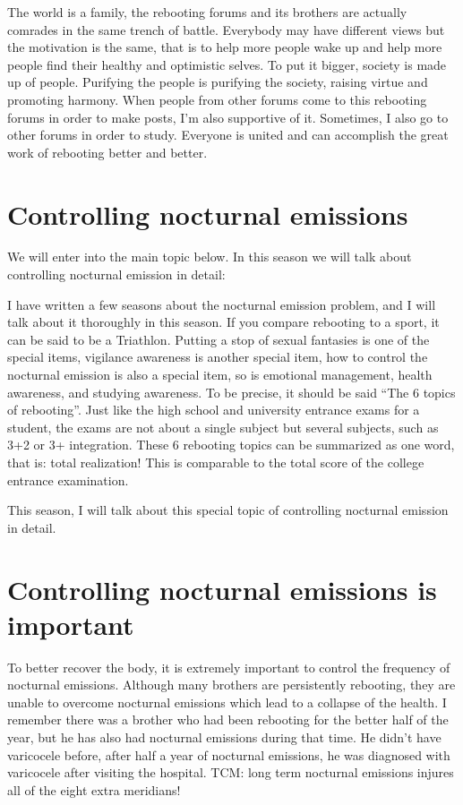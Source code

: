 \documentclass[
]{book}
\begin{document}
The world is a family, the rebooting forums and its brothers are actually comrades in the same trench of battle. Everybody may have different views but the motivation is the same, that is to help more people wake up and help more people find their healthy and optimistic selves. To put it bigger, society is made up of people. Purifying the people is purifying the society, raising virtue and promoting harmony. When people from other forums come to this rebooting forums in order to make posts, I'm also supportive of it. Sometimes, I also go to other forums in order to study. Everyone is united and can accomplish the great work of rebooting better and better.

\hypertarget{controlling-nocturnal-emissions}{%
\section{Controlling nocturnal emissions}\label{controlling-nocturnal-emissions}}

We will enter into the main topic below. In this season we will talk about controlling nocturnal emission in detail:

I have written a few seasons about the nocturnal emission problem, and I will talk about it thoroughly in this season. If you compare rebooting to a sport, it can be said to be a Triathlon. Putting a stop of sexual fantasies is one of the special items, vigilance awareness is another special item, how to control the nocturnal emission is also a special item, so is emotional management, health awareness, and studying awareness. To be precise, it should be said ``The 6 topics of rebooting''. Just like the high school and university entrance exams for a student, the exams are not about a single subject but several subjects, such as 3+2 or 3+ integration. These 6 rebooting topics can be summarized as one word, that is: total realization! This is comparable to the total score of the college entrance examination.

This season, I will talk about this special topic of controlling nocturnal emission in detail.

\hypertarget{controlling-nocturnal-emissions-is-important}{%
\section{Controlling nocturnal emissions is important}\label{controlling-nocturnal-emissions-is-important}}

To better recover the body, it is extremely important to control the frequency of nocturnal emissions. Although many brothers are persistently rebooting, they are unable to overcome nocturnal emissions which lead to a collapse of the health. I remember there was a brother who had been rebooting for the better half of the year, but he has also had nocturnal emissions during that time. He didn't have varicocele before, after half a year of nocturnal emissions, he was diagnosed with varicocele after visiting the hospital. TCM: long term nocturnal emissions injures all of the eight extra meridians!
\end{document}

